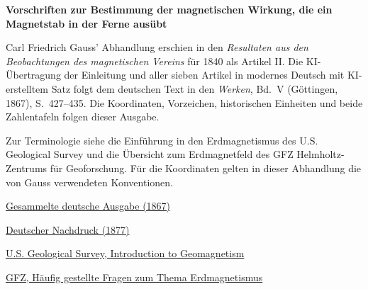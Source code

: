 \clearpage
\thispagestyle{empty}
\begin{center}\Large\textbf{Vorschriften zur Bestimmung der magnetischen Wirkung, die ein Magnetstab in der Ferne ausübt}\end{center}

Carl Friedrich Gauss’ Abhandlung erschien in den \textit{Resultaten aus den Beobachtungen des magnetischen Vereins} für 1840 als Artikel II. Die KI-Übertragung der Einleitung und aller sieben Artikel in modernes Deutsch mit KI-erstelltem Satz folgt dem deutschen Text in den \textit{Werken}, Bd.~V (Göttingen, 1867), S.~427--435. Die Koordinaten, Vorzeichen, historischen Einheiten und beide Zahlentafeln folgen dieser Ausgabe.

\medskip\noindent
Zur Terminologie siehe die Einführung in den Erdmagnetismus des U.S. Geological Survey und die Übersicht zum Erdmagnetfeld des GFZ Helmholtz-Zentrums für Geoforschung. Für die Koordinaten gelten in dieser Abhandlung die von Gauss verwendeten Konventionen.

\medskip\noindent
\href{https://gdz.sub.uni-goettingen.de/id/PPN236006339}{Gesammelte deutsche Ausgabe (1867)}\par
\noindent\href{https://doi.org/10.1007/978-3-642-49319-5_20}{Deutscher Nachdruck (1877)}\par
\noindent\href{https://www.usgs.gov/programs/geomagnetism/introduction-geomagnetism}{U.S. Geological Survey, Introduction to Geomagnetism}\par
\noindent\href{https://www.gfz.de/sektion/geomagnetismus/daten-produkte-dienste/haeufig-gestellte-fragen-zum-thema-erdmagnetismus}{GFZ, Häufig gestellte Fragen zum Thema Erdmagnetismus}
\clearpage
